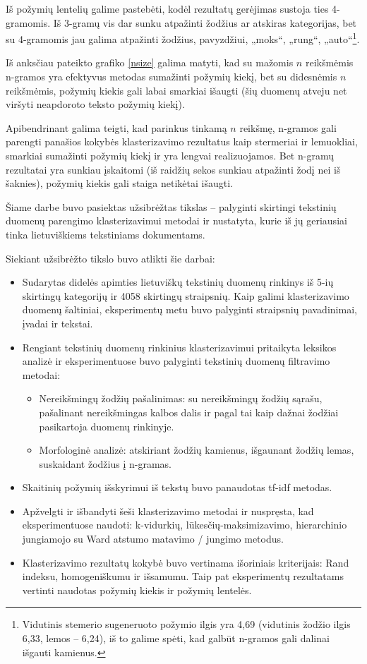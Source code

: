 \documentclass{VUMIFInfBakalaurinis}
\providecommand{\tightlist}{%
	  \setlength{\itemsep}{0pt}\setlength{\parskip}{0pt}}
\begin{document}
Iš požymių lentelių galime pastebėti, kodėl rezultatų gerėjimas sustoja
ties 4-gramomis. Iš 3-gramų vis dar sunku atpažinti žodžius ar atskiras
kategorijas, bet su 4-gramomis jau galima atpažinti žodžius, pavyzdžiui,
„moks“, „rung“, „auto“\footnote{Vidutinis stemerio sugeneruoto
  požymio ilgis yra 4,69 (vidutinis žodžio ilgis 6,33, lemos -- 6,24),
  iš to galime spėti, kad galbūt n-gramos gali dalinai išgauti kamienus.}.

Iš anksčiau pateikto grafiko \ref{nsize} galima
matyti, kad su mažomis $n$ reikšmėmis n-gramos yra efektyvus
metodas sumažinti požymių kiekį, bet su didesnėmis $n$ reikšmėmis,
požymių kiekis gali labai smarkiai išaugti (šių duomenų atveju net
viršyti neapdoroto teksto požymių kiekį).

Apibendrinant galima teigti, kad parinkus tinkamą $n$
reikšmę, n-gramos gali parengti panašios kokybės klasterizavimo
rezultatus kaip stermeriai ir lemuokliai, smarkiai sumažinti požymių
kiekį ir yra lengvai realizuojamos. Bet n-gramų rezultatai yra sunkiau
įskaitomi (iš raidžių sekos sunkiau atpažinti žodį nei iš šaknies),
požymių kiekis gali staiga netikėtai išaugti.

Šiame darbe buvo pasiektas užsibrėžtas tikslas -- palyginti skirtingi
tekstinių duomenų parengimo klasterizavimui metodai ir nustatyta, kurie
iš jų geriausiai tinka lietuviškiems tekstiniams dokumentams.

Siekiant užsibrėžto tikslo buvo atlikti šie darbai:

\begin{itemize}
\tightlist
\item
  Sudarytas didelės apimties lietuviškų tekstinių duomenų rinkinys iš
  5-ių skirtingų kategorijų ir 4058 skirtingų straipsnių. Kaip galimi
  klasterizavimo duomenų šaltiniai, eksperimentų metu buvo palyginti
  straipsnių pavadinimai, įvadai ir tekstai.
\item
  Rengiant tekstinių duomenų rinkinius klasterizavimui pritaikyta
  leksikos analizė ir eksperimentuose buvo palyginti tekstinių duomenų
  filtravimo metodai:

  \begin{itemize}
  \item
    Nereikšmingų žodžių pašalinimas: su nereikšmingų žodžių sąrašu,
    pašalinant nereikšmingas kalbos dalis ir pagal tai kaip dažnai žodžiai pasikartoja
    duomenų rinkinyje.
  \item
    Morfologinė analizė: atskiriant žodžių kamienus, išgaunant žodžių
    lemas, suskaidant žodžius į n-gramas.
  \end{itemize}
\item
  Skaitinių požymių išskyrimui iš tekstų buvo panaudotas tf-idf metodas.
\item
  Apžvelgti ir išbandyti šeši klasterizavimo metodai ir nuspręsta, kad
  eksperimentuose naudoti: k-vidurkių, lūkesčių-maksimizavimo,
  hierarchinio jungiamojo su Ward atstumo matavimo / jungimo metodus.
\item
  Klasterizavimo rezultatų kokybė buvo vertinama išoriniais kriterijais: Rand
  indeksu, homogeniškumu ir išsamumu. Taip pat eksperimentų rezultatams
  vertinti naudotas požymių kiekis ir požymių lentelės.
\end{itemize}
\end{document}
